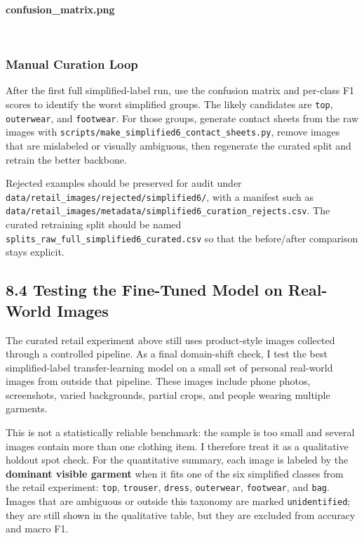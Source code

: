\documentclass[11pt]{article}
\begin{document}
    \textbf{confusion\_matrix.png}

    
    \begin{center}
    \end{center}
    { \hspace*{\fill} \\}
    
    \subsubsection{Manual Curation Loop}\label{manual-curation-loop}

After the first full simplified-label run, use the confusion matrix and
per-class F1 scores to identify the worst simplified groups. The likely
candidates are \texttt{top}, \texttt{outerwear}, and \texttt{footwear}.
For those groups, generate contact sheets from the raw images with
\texttt{scripts/make\_simplified6\_contact\_sheets.py}, remove images
that are mislabeled or visually ambiguous, then regenerate the curated
split and retrain the better backbone.

Rejected examples should be preserved for audit under
\texttt{data/retail\_images/rejected/simplified6/}, with a manifest such
as
\texttt{data/retail\_images/metadata/simplified6\_curation\_rejects.csv}.
The curated retraining split should be named
\texttt{splits\_raw\_full\_simplified6\_curated.csv} so that the
before/after comparison stays explicit.

    \subsection{8.4 Testing the Fine-Tuned Model on Real-World
Images}\label{testing-the-fine-tuned-model-on-real-world-images}

The curated retail experiment above still uses product-style images
collected through a controlled pipeline. As a final domain-shift check,
I test the best simplified-label transfer-learning model on a small set
of personal real-world images from outside that pipeline. These images
include phone photos, screenshots, varied backgrounds, partial crops,
and people wearing multiple garments.

This is not a statistically reliable benchmark: the sample is too small
and several images contain more than one clothing item. I therefore
treat it as a qualitative holdout spot check. For the quantitative
summary, each image is labeled by the \textbf{dominant visible garment}
when it fits one of the six simplified classes from the retail
experiment: \texttt{top}, \texttt{trouser}, \texttt{dress},
\texttt{outerwear}, \texttt{footwear}, and \texttt{bag}. Images that are
ambiguous or outside this taxonomy are marked \texttt{unidentified};
they are still shown in the qualitative table, but they are excluded
from accuracy and macro F1.
\end{document}
